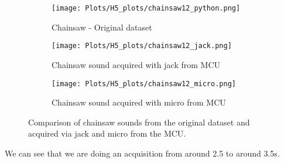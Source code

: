 \documentclass{article}
\begin{document}
\begin{figure}[H]
    \centering
    \begin{subfigure}{0.35\linewidth} %
        \centering
        \texttt{[image: Plots/H5\_plots/chainsaw12\_python.png]}
        \caption{Chainsaw - Original dataset}
    \end{subfigure}
    \hfill
    \begin{subfigure}{0.27\linewidth} %
        \centering
        \texttt{[image: Plots/H5\_plots/chainsaw12\_jack.png]}
        \caption{Chainsaw sound acquired with jack from MCU}
    \end{subfigure}
    \hfill
    \begin{subfigure}{0.27\linewidth} %
        \centering
        \texttt{[image: Plots/H5\_plots/chainsaw12\_micro.png]}
        \caption{Chainsaw sound acquired with micro from MCU}
    \end{subfigure}
    \caption{Comparison of chainsaw sounds from the original dataset and  acquired via jack and micro from the MCU.}
\end{figure}

We can see that we are doing an acquisition from around 2.5 to around 3.5s.
\end{document}
